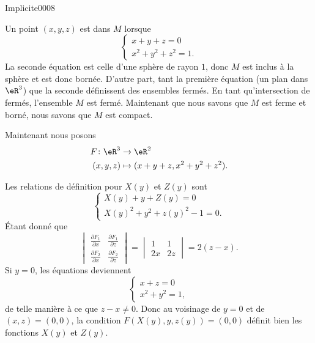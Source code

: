 
\begin{corrige}{Implicite0008}

	Un point $(x,y,z)$ est dans $M$ lorsque
	\begin{equation}
		\left\{
		\begin{array}{ll}
			x+y+z=0\\
			x^2+y^2+z^2=1.
		\end{array}
		\right.
	\end{equation}
	La seconde équation est celle d'une sphère de rayon $1$, donc $M$ est inclus à la sphère et est donc bornée. D'autre part, tant la première équation (un plan dans $\eR^3$) que la seconde définissent des ensembles fermés. En tant qu'intersection de fermés, l'ensemble $M$ est fermé. Maintenant que nous savons que $M$ est ferme et borné, nous savons que $M$ est compact.

	Maintenant nous posons
	\begin{equation}
		\begin{aligned}
			F\colon \eR^3&\to \eR^2 \\
			(x,y,z)&\mapsto (x+y+z,x^2+y^2+z^2). 
		\end{aligned}
	\end{equation}

	Les relations de définition pour $X(y)$ et $Z(y)$ sont
	\begin{equation}			\label{EqHuitEqsqDefXZ}
		\left\{
		\begin{array}{ll}
			X(y)+y+Z(y)=0\\
			X(y)^2+y^2+z(y)^2-1=0.
		\end{array}
		\right.
	\end{equation}
	Étant donné que
	\begin{equation}
		\begin{vmatrix}
			\frac{ \partial F_1 }{ \partial x }	&	\frac{ \partial F_1 }{ \partial z }	\\ 
			\frac{ \partial F_2 }{ \partial x }	&	\frac{ \partial F_2 }{ \partial z }	
		\end{vmatrix}
		=
		\begin{vmatrix}
			1	&	1	\\ 
			2x	&	2z	
		\end{vmatrix}
		=
		2(z-x).
	\end{equation}
	Si $y=0$, les équations deviennent
	\begin{equation}
		\left\{
		\begin{array}{ll}
			x+z=0\\
			x^2+y^2=1,
		\end{array}
		\right.
	\end{equation}
	de telle manière à ce que $z-x\neq 0$. Donc au voisinage de $y=0$ et de $(x,z)=(0,0)$, la condition $F(X(y),y,z(y))=(0,0)$ définit bien les fonctions $X(y)$ et $Z(y)$.


\end{corrige}
